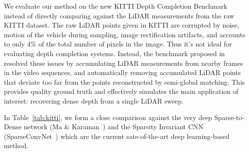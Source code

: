 We evaluate our method on the new KITTI Depth Completion Benchmark~\cite{uhrig} instead of directly comparing against the LiDAR measurements from the raw KITTI dataset. The raw LiDAR points given in KITTI are corrupted by noise, motion of the vehicle during sampling, image rectification artifacts, and accounts to only 4\% of the total number of pixels in the image. Thus it's not ideal for evaluating depth completion systems. Instead, the benchmark proposed in~\cite{uhrig} resolved these issues by accumulating LiDAR measurements from nearby frames in the video sequences, and automatically removing accumulated LiDAR points that deviate too far from the points reconstructed by semi-global matching. This provides quality ground truth and effectively simulates the main application of interest: recovering dense depth from a single LiDAR sweep.



In Table~\ref{tab:kitti}, we form a close comparison against the very deep Sparse-to-Dense network (Ma \& Karaman~\cite{sparsetodense}) and the Sparsity Invariant CNN (SparseConvNet~\cite{uhrig}) which are the current sate-of-the-art deep learning-based method.

